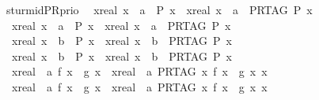 \begin{isabellebody}
\endisatagproof
{\isafoldproof}%
%
\isadelimproof
\isanewline
%
\endisadelimproof
\isanewline
{}\isamarkupfalse%
\ sturm{\isacharunderscore}id{\isacharunderscore}PR{\isacharunderscore}prio{}{\isacharcolon}\isanewline
\ \ {\isachardoublequoteopen}{\isacharbraceleft}x{\isacharcolon}{\isacharcolon}real{\isachardot}\ x\ {\isacharless}\ a\ {\isasymand}\ P\ x{\isacharbraceright}\ {\isacharequal}\ {\isacharbraceleft}x{\isacharcolon}{\isacharcolon}real{\isachardot}\ x\ {\isacharless}\ a\ {\isasymand}\ {\isacharparenleft}PR{\isacharunderscore}TAG\ P{\isacharparenright}\ x{\isacharbraceright}{\isachardoublequoteclose}\isanewline
\ \ {\isachardoublequoteopen}{\isacharbraceleft}x{\isacharcolon}{\isacharcolon}real{\isachardot}\ x\ {\isasymle}\ a\ {\isasymand}\ P\ x{\isacharbraceright}\ {\isacharequal}\ {\isacharbraceleft}x{\isacharcolon}{\isacharcolon}real{\isachardot}\ x\ {\isasymle}\ a\ {\isasymand}\ {\isacharparenleft}PR{\isacharunderscore}TAG\ P{\isacharparenright}\ x{\isacharbraceright}{\isachardoublequoteclose}\isanewline
\ \ {\isachardoublequoteopen}{\isacharbraceleft}x{\isacharcolon}{\isacharcolon}real{\isachardot}\ x\ {\isasymge}\ b\ {\isasymand}\ P\ x{\isacharbraceright}\ {\isacharequal}\ {\isacharbraceleft}x{\isacharcolon}{\isacharcolon}real{\isachardot}\ x\ {\isasymge}\ b\ {\isasymand}\ {\isacharparenleft}PR{\isacharunderscore}TAG\ P{\isacharparenright}\ x{\isacharbraceright}{\isachardoublequoteclose}\isanewline
\ \ {\isachardoublequoteopen}{\isacharbraceleft}x{\isacharcolon}{\isacharcolon}real{\isachardot}\ x\ {\isachargreater}\ b\ {\isasymand}\ P\ x{\isacharbraceright}\ {\isacharequal}\ {\isacharbraceleft}x{\isacharcolon}{\isacharcolon}real{\isachardot}\ x\ {\isachargreater}\ b\ {\isasymand}\ {\isacharparenleft}PR{\isacharunderscore}TAG\ P{\isacharparenright}\ x{\isacharbraceright}{\isachardoublequoteclose}\isanewline
\ \ {\isachardoublequoteopen}{\isacharparenleft}{\isasymforall}x{\isacharcolon}{\isacharcolon}real\ {\isacharless}\ a{\isachardot}\ f\ x\ {\isacharless}\ g\ x{\isacharparenright}\ {\isacharequal}\ {\isacharparenleft}{\isasymforall}x{\isacharcolon}{\isacharcolon}real\ {\isacharless}\ a{\isachardot}\ PR{\isacharunderscore}TAG\ {\isacharparenleft}{\isasymlambda}x{\isachardot}\ f\ x\ {\isacharless}\ g\ x{\isacharparenright}\ x{\isacharparenright}{\isachardoublequoteclose}\isanewline
\ \ {\isachardoublequoteopen}{\isacharparenleft}{\isasymforall}x{\isacharcolon}{\isacharcolon}real\ {\isasymle}\ a{\isachardot}\ f\ x\ {\isacharless}\ g\ x{\isacharparenright}\ {\isacharequal}\ {\isacharparenleft}{\isasymforall}x{\isacharcolon}{\isacharcolon}real\ {\isasymle}\ a{\isachardot}\ PR{\isacharunderscore}TAG\ {\isacharparenleft}{\isasymlambda}x{\isachardot}\ f\ x\ {\isacharless}\ g\ x{\isacharparenright}\ x{\isacharparenright}{\isachardoublequoteclose}\isanewline

\end{isabellebody}
